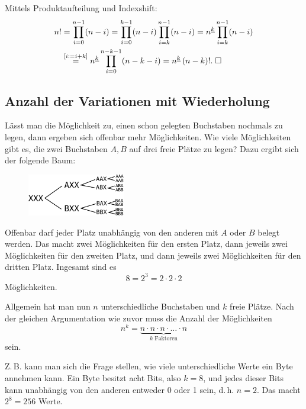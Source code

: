  Mittels Produktaufteilung und Indexshift:
\begin{align*}
n! &= \prod_{i=0}^{n-1}(n-i)
= \prod_{i=0}^{k-1} (n-i) \prod_{i=k}^{n-1} (n-i)
= n^{\underline k} \prod_{i=k}^{n-1} (n-i)\\
&\stackrel{[i:=i+k]}= n^{\underline k}\prod_{i=0}^{n-k-1} (n-k-i)
= n^{\underline k}\,(n-k)!.\;\Box
\end{align*}

\subsection{Anzahl der Variationen mit Wiederholung}%

Lässt man die Möglichkeit zu, einen schon gelegten Buchstaben
nochmals zu legen, dann ergeben sich offenbar mehr Möglichkeiten.
Wie viele Möglichkeiten gibt es, die zwei Buchstaben $A,B$
auf drei freie Plätze zu legen? Dazu ergibt sich der folgende
Baum:

\begin{figure}[h]
\begin{center}
\includegraphics[width=0.38\textwidth]{img/VariW-XXX-AB.pdf}
\end{center}
\end{figure}

\noindent
Offenbar darf jeder Platz unabhängig von den anderen mit $A$ oder
$B$ belegt werden. Das macht zwei Möglichkeiten für den ersten
Platz, dann jeweils zwei Möglichkeiten für den zweiten Platz,
und dann jeweils zwei Möglichkeiten für den dritten Platz.
Ingesamt sind es
\[8 = 2^3 = 2\cdot 2\cdot 2\]
Möglichkeiten.

Allgemein hat man nun $n$ unterschiedliche Buchstaben und $k$
freie Plätze. Nach der gleichen Argumentation wie zuvor muss die
Anzahl der Möglichkeiten
\[n^k = \underbrace{n\cdot n\cdot n\cdot\ldots\cdot n}_\text{$k$ Faktoren}\]
sein.

Z.\,B. kann man sich die Frage stellen, wie viele unterschiedliche
Werte ein Byte annehmen kann. Ein Byte besitzt acht Bits, also $k=8$,
und jedes dieser Bits kann unabhängig von den anderen entweder 0 oder 1
sein, d.\,h. $n=2$. Das macht $2^8=256$ Werte.
